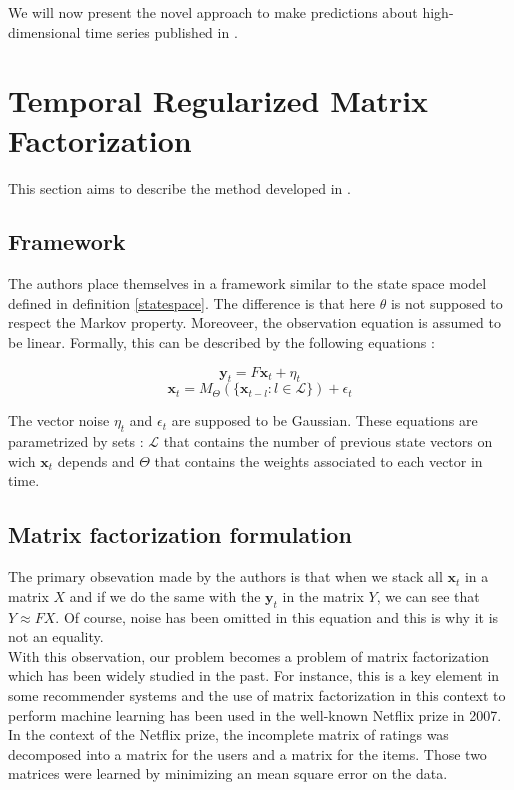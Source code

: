 \documentclass{article}
\begin{document}
We will now present the novel approach to make predictions about high-dimensional time series published in \cite{TRMF}.

\section{Temporal Regularized Matrix Factorization}
This section aims to describe the method developed in \cite{TRMF}. \\

\subsection*{Framework}
The authors place themselves in a framework similar to the state space model defined in definition \ref{statespace}.
The difference is that here $\theta$ is not supposed to respect the Markov property. Moreoveer, the observation equation is assumed to be linear.
Formally, this can be described by the following equations :

\begin{equation}
\mathbf{y}_t = F\mathbf{x}_t + \eta_t
\end{equation}
\begin{equation}
\mathbf{x}_t = M_{\Theta}(\{\mathbf{x}_{t-l} : l \in \mathcal{L} \}) + \epsilon_t
\label{eq:evol}
\end{equation}

The vector noise $\eta_t$ and $\epsilon_t$ are supposed to be Gaussian. These equations are parametrized by sets : $\mathcal{L}$ that contains the number of previous state vectors on wich $\mathbf{x}_t$ depends and $\Theta$ that contains the weights associated to each vector in time.

\subsection*{Matrix factorization formulation}
The primary obsevation made by the authors is that when we stack all $\mathbf{x}_t$ in a matrix $X$ and if we do the same with the $\mathbf{y}_t$ in the matrix $Y$, we can see that $Y \approx FX$. Of course, noise has been omitted in this equation and this is why it is not an equality. \\

With this observation, our problem becomes a problem of matrix factorization which has been widely studied in the past. For instance, this is a key element in some recommender systems and the use of matrix factorization in this context to perform machine learning has been used in the well-known Netflix prize in 2007.
In the context of the Netflix prize, the incomplete matrix of ratings was decomposed into a matrix for the users and a matrix for the items. Those two matrices were learned by minimizing an mean square error on the data. \\
\end{document}
